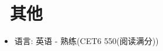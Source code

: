 \documentclass{resume}
\begin{document}
\section{\faInfo\ 其他}
\begin{itemize}[parsep=0.5ex]
  \item 语言: 英语 - 熟练(CET6 550(阅读满分))
\end{itemize}

%
%
\end{document}
